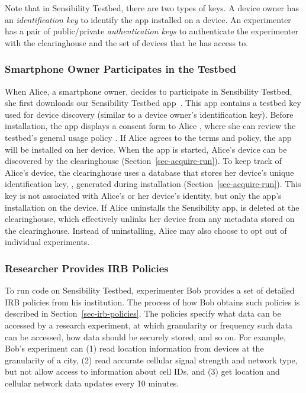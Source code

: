 Note that in Sensibility Testbed, there are two types of keys. A device
owner has an \textit{identification key} to identify the app installed on a 
device. An experimenter has a pair of public/private \textit{authentication 
keys} to authenticate the experimenter with the clearinghouse and 
the set of devices that he has access to.

\subsubsection{Smartphone Owner Participates in the Testbed}
\label{sec-owner-participate}

When Alice, a smartphone owner, decides to participate in
Sensibility Testbed, she first downloads our Sensibility Testbed
app~\cite{sensibility-app}. %
This app contains a testbed key  used for 
device discovery (similar to a device owner's identification key). 
Before installation, the app displays a
consent form to Alice , where she can review
the testbed's general usage policy . If Alice
agrees to the terms and policy, the app will be installed on her
device. When the app is started, Alice's device can be
discovered by the clearinghouse (Section~\ref{sec-acquire-run}). 
To keep track of Alice's device, the
clearinghouse uses a database that stores her device's unique
identification key, , generated during installation 
(Section~\ref{sec-acquire-run}). This key is not associated with Alice's or her
device's identity, but only the app's installation on the device. If
Alice uninstalls the Sensibility app,  is
deleted at the clearinghouse, which effectively unlinks
her device from any metadata stored on the clearinghouse.
Instead of uninstalling, Alice may also choose to opt out of
individual experiments.

\subsubsection{Researcher Provides IRB
Policies}\label{sec-irb-policy}

To run code on Sensibility Testbed, experimenter Bob provides a
set of detailed IRB policies from his institution. The process of how
Bob obtains such policies is described in Section~\ref{sec-irb-policies}.
The policies specify 
what data can be accessed by a research experiment, at which 
granularity or frequency such data can be accessed, how data 
should be securely stored, and so on. 
For example, Bob's experiment can (1) read location information
from devices at the granularity of a city, (2) read accurate
cellular signal strength and network type, but not allow access to 
information about cell IDs, and (3) get location and
cellular network data updates every 10 minutes. 

